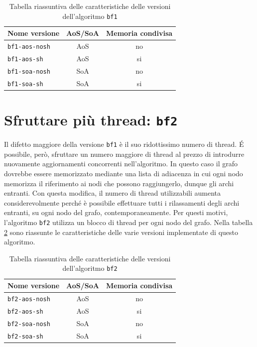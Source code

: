 \documentclass[12pt,a4paper,oneside]{book}
\begin{document}
	\begin{table}[!ht]
		\centering
		\begin{tabular}{|l|c|c|}
			\hline
			\textbf{Nome versione} & \textbf{AoS/SoA} & \textbf{Memoria condivisa} \\ \hline
			\texttt{bf1-aos-nosh}  & AoS & no \\ \hline
			\texttt{bf1-aos-sh}    & AoS & si \\ \hline
			\texttt{bf1-soa-nosh}  & SoA & no \\ \hline
			\texttt{bf1-soa-sh}    & SoA & si \\ \hline
		\end{tabular}
		\caption{Tabella riassuntiva delle caratteristiche delle versioni dell'algoritmo \texttt{bf1}}
		\label{tab:riassunto_bf1}
	\end{table}
	
	\section{Sfruttare più thread: \texttt{bf2}}
	\label{section:intro-bf2}
	Il difetto maggiore della versione \texttt{bf1} è il suo ridottissimo numero di thread. \'E possibile, però, sfruttare un numero maggiore di thread al prezzo di introdurre nuovamente aggiornamenti concorrenti nell'algoritmo. In questo caso il grafo dovrebbe essere memorizzato mediante una lista di adiacenza in cui ogni nodo memorizza il riferimento ai nodi che possono raggiungerlo, dunque gli archi entranti. Con questa modifica, il numero di thread utilizzabili aumenta considerevolmente perché è possibile effettuare tutti i rilassamenti degli archi entranti, su ogni nodo del grafo, contemporaneamente. Per questi motivi, l'algoritmo \texttt{bf2} utilizza un blocco di thread per ogni nodo del grafo. Nella tabella \ref{tab:riassunto_bf2} sono riassunte le caratteristiche delle varie versioni implementate di questo algoritmo.

	\begin{table}[!ht]
		\centering
		\begin{tabular}{|l|c|c|}
			\hline
			\textbf{Nome versione} & \textbf{AoS/SoA} & \textbf{Memoria condivisa} \\ \hline
			\texttt{bf2-aos-nosh}  & AoS & no \\ \hline
			\texttt{bf2-aos-sh}    & AoS & si \\ \hline
			\texttt{bf2-soa-nosh}  & SoA & no \\ \hline
			\texttt{bf2-soa-sh}    & SoA & si \\ \hline
		\end{tabular}
		\caption{Tabella riassuntiva delle caratteristiche delle versioni dell'algoritmo \texttt{bf2}}
		\label{tab:riassunto_bf2}
	\end{table}
	
\end{document}
